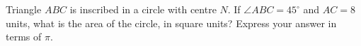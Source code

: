 Triangle $ABC$ is inscribed in a circle with centre $N$. If $\angle ABC=45^\circ$ and $AC=8$ units, what is the area of the circle, in square units? Express your answer in terms of $\pi$.
